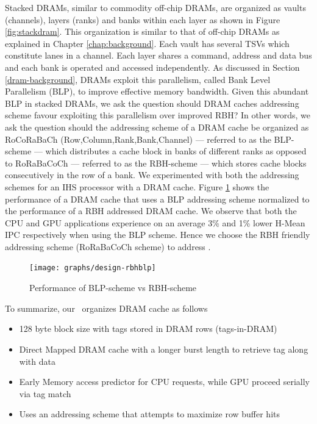 Stacked DRAMs, similar to commodity off-chip DRAMs, are organized as vaults (channels), layers (ranks) and banks within each layer as shown in Figure \ref{fig:stackdram}. This organization is similar to that of off-chip DRAMs as explained in Chapter \ref{chap:background}. Each vault has several TSVs which constitute lanes in a channel. Each layer shares a command, address and data bus and each bank is  operated and accessed independently. As discussed in Section \ref{dram-background}, DRAMs exploit this parallelism, called Bank Level Parallelism (BLP), to improve effective memory bandwidth. Given this abundant BLP in stacked DRAMs, we ask the question should DRAM caches addressing scheme favour exploiting this parallelism over improved RBH? In other words, we ask the question should the addressing scheme of a DRAM cache be organized as RoCoRaBaCh (Row,Column,Rank,Bank,Channel) --- referred to as the BLP-scheme --- which distributes a cache block in banks of different ranks as opposed to RoRaBaCoCh --- referred to as the RBH-scheme --- which stores cache blocks consecutively in the row of a bank. We experimented with both the addressing schemes for an IHS processor with a DRAM cache. Figure \ref{fig:design-rbhblp} shows the performance of a DRAM cache that uses a BLP addressing scheme normalized to the performance of a RBH addressed DRAM cache. We observe that both the CPU and GPU applications experience on an average 3\% and 1\% lower H-Mean IPC respectively when using the BLP scheme. Hence we choose the RBH friendly addressing scheme (RoRaBaCoCh scheme) to address \cachename.
\begin{figure}[!htb]
	\centering
	\texttt{[image: graphs/design-rbhblp]}
	\caption{Performance of BLP-scheme vs RBH-scheme}
	\label{fig:design-rbhblp}
\end{figure}

\par To summarize, our \cachename\ organizes DRAM cache as follows
\begin{itemize}
	\item 128 byte block size with tags stored in DRAM rows (tags-in-DRAM)
	\item Direct Mapped DRAM cache with a longer burst length to retrieve tag along with data
	\item Early Memory access predictor for CPU requests, while GPU proceed serially via tag match
	\item Uses an addressing scheme that attempts to maximize row buffer hits
\end{itemize}


